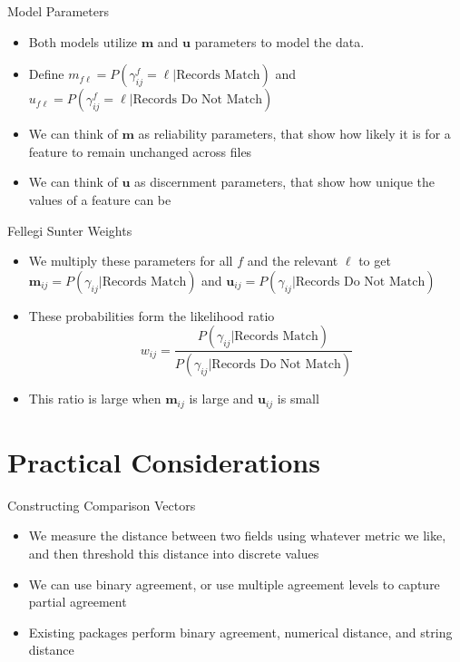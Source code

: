\documentclass{beamer}
\begin{document}
\begin{frame}{Model Parameters}
	\begin{itemize}
		\item Both models utilize $\mathbf{m}$ and $\mathbf{u}$ parameters to model the data.
		\item Define $m_{f\ell} = P(\gamma_{ij}^f = \ell | \text{Records Match})$ and $u_{f\ell} = P(\gamma_{ij}^f = \ell | \text{Records Do Not Match})$
		\item We can think of $\mathbf{m}$ as reliability parameters, that show how likely it is for a feature to remain unchanged across files
		\item We can think of $\mathbf{u}$ as discernment parameters, that show how unique the values of a feature can be
	\end{itemize}
\end{frame}

\begin{frame}{Fellegi Sunter Weights}
	\begin{itemize}
		\item We multiply these parameters for all $f$ and the relevant $\ell$ to get $\mathbf{m}_{ij} = P(\gamma_{ij}| \text{Records Match})$ and $\mathbf{u}_{ij} = P(\gamma_{ij}| \text{Records Do Not Match})$
		\item These probabilities form the likelihood ratio 
		$$w_{ij} = \frac{P(\gamma_{ij}| \text{Records Match})}{P(\gamma_{ij}| \text{Records Do Not Match})}$$
		\item This ratio is large when $\mathbf{m}_{ij}$ is large and $\mathbf{u}_{ij}$ is small
	\end{itemize}
\end{frame}

\section{Practical Considerations}

\begin{frame}{Constructing Comparison Vectors}
	\begin{itemize}
		\item We measure the distance between two fields using whatever metric we like, and then threshold this distance into discrete values
		\item We can use binary agreement, or use multiple agreement levels to capture partial agreement
		\item Existing packages perform binary agreement, numerical distance, and string distance
	\end{itemize}
\end{frame}
\end{document}
